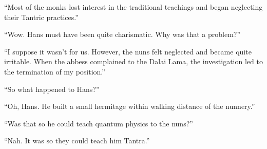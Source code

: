 ``Most of the monks lost interest in the traditional teachings and began neglecting their Tantric practices.''

``Wow. Hans must have been quite charismatic. Why was that a problem?''

``I suppose it wasn't for us. However, the nuns felt neglected and became quite irritable. When the abbess complained to the Dalai Lama, the investigation led to the termination of my position.''

``So what happened to Hans?''

``Oh, Hans. He built a small hermitage within walking distance of the nunnery.''

``Was that so he could teach quantum physics to the nuns?''

``Nah. It was so they could teach him Tantra.''



